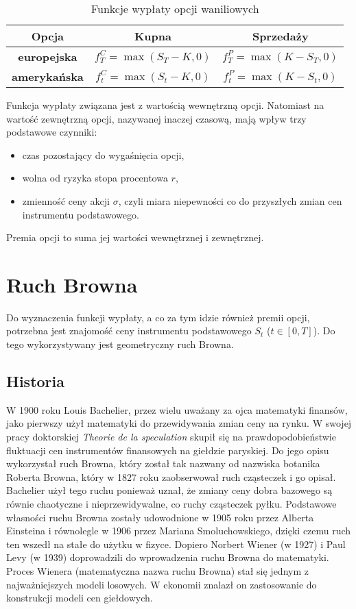 \documentclass[]{pwr_wmat_praca_dyplomowa}
\theoremstyle{plain}
\numberwithin{theorem}{chapter}
\theoremstyle{definition}
\numberwithin{theorem}{chapter}
\begin{document}
\begin{table}[ht]
\caption{Funkcje wypłaty opcji waniliowych}
\centering
\begin{tabular}{|c|c|c|}
\hline                       
\textbf{Opcja} & \textbf{Kupna} & \textbf{Sprzedaży}\\
\hline 
\textbf{europejska} & $f_T^C = \max(S_T-K,0)$ & $f_T^P = \max(K-S_T,0)$  \\[1ex]
\textbf{amerykańska} & $f_t^C = \max(S_t-K,0)$ & $f_t^P = \max(K-S_t,0)$  \\[1ex]  
\hline 
\end{tabular}
\label{tab:wyplata} 
\end{table}
\noindent Funkcja wypłaty związana jest z wartością wewnętrzną opcji. Natomiast na wartość zewnętrzną opcji, nazywanej inaczej czasową, mają wpływ trzy podstawowe czynniki:
\begin{itemize}
\item czas pozostający do wygaśnięcia opcji,
\item wolna od ryzyka stopa procentowa $r$,
\item zmienność ceny akcji $\sigma$, czyli miara niepewności co do przyszłych zmian cen instrumentu podstawowego.
\end{itemize}
Premia opcji to suma jej wartości wewnętrznej i zewnętrznej.

\section{Ruch Browna}

Do wyznaczenia funkcji wypłaty, a co za tym idzie również premii opcji, potrzebna jest znajomość ceny instrumentu podstawowego $S_t$ ($t \in [0,T]$). Do tego wykorzystywany jest geometryczny ruch Browna.

\subsection{Historia}

W 1900 roku Louis Bachelier, przez wielu uważany za ojca matematyki finansów, jako pierwszy użył matematyki do przewidywania zmian ceny na rynku. W swojej pracy doktorskiej \textit{Theorie de la speculation} skupił się na prawdopodobieństwie fluktuacji cen instrumentów finansowych na giełdzie paryskiej. Do jego opisu wykorzystał ruch Browna, który został tak nazwany od nazwiska botanika Roberta Browna, który w 1827 roku zaobserwował ruch cząsteczek i go opisał. Bachelier użył tego ruchu ponieważ uznał, że zmiany ceny dobra bazowego są równie chaotyczne i nieprzewidywalne, co ruchy cząsteczek pyłku. Podstawowe własności ruchu Browna zostały udowodnione w 1905 roku przez Alberta Einsteina i równolegle w 1906 przez Mariana Smoluchowskiego, dzięki czemu ruch ten wszedł na stałe do użytku w fizyce. Dopiero Norbert Wiener (w 1927) i Paul Levy (w 1939) doprowadzili do wprowadzenia ruchu Browna do matematyki. Proces Wienera (matematyczna nazwa ruchu Browna) stał się jednym z najważniejszych modeli losowych. W ekonomii znalazł on zastosowanie do konstrukcji modeli cen giełdowych.\\
\end{document}
